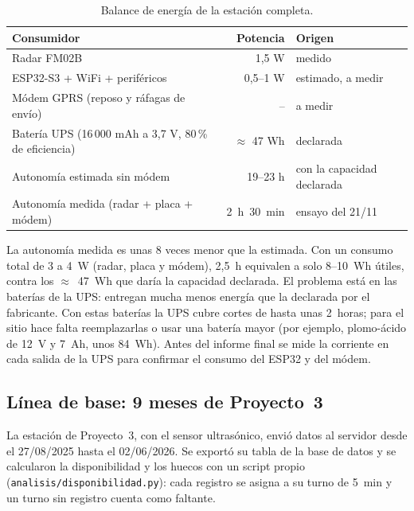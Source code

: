 \documentclass[11pt,a4paper]{article}
\begin{document}
\begin{table}[H]
    \centering
    \small
    \caption{Balance de energía de la estación completa.}
    \begin{tabular}{lrl}
        \toprule
        \textbf{Consumidor} & \textbf{Potencia} & \textbf{Origen} \\
        \midrule
        Radar FM02B & 1,5 W & medido \\
        ESP32-S3 + WiFi + periféricos & 0,5--1 W & estimado, a medir \\
        Módem GPRS (reposo y ráfagas de envío) & -- & a medir \\
        \midrule
        Batería UPS (16\,000 mAh a 3,7 V, 80\,\% de eficiencia) & $\approx$ 47 Wh & declarada \\
        Autonomía estimada sin módem & 19--23 h & con la capacidad declarada \\
        Autonomía medida (radar + placa + módem) & 2~h~30~min & ensayo del 21/11 \\
        \bottomrule
    \end{tabular}
\end{table}

La autonomía medida es unas 8 veces menor que la estimada. Con un consumo total
de 3 a 4~W (radar, placa y módem), 2,5~h equivalen a solo 8--10~Wh útiles,
contra los $\approx$~47~Wh que daría la capacidad declarada. El problema
está en las baterías de la UPS: entregan mucha menos energía que la declarada
por el fabricante. Con estas baterías la UPS cubre cortes de hasta unas
2~horas; para el sitio hace falta reemplazarlas o usar una batería mayor (por
ejemplo, plomo-ácido de 12~V y 7~Ah, unos 84~Wh). Antes del informe final se
mide la corriente en cada salida de la UPS para confirmar el consumo del
ESP32 y del módem.

\subsection{Línea de base: 9 meses de Proyecto~3}
\label{sec:linea_base}

La estación de Proyecto~3, con el sensor ultrasónico, envió datos al servidor
desde el 27/08/2025 hasta el 02/06/2026. Se exportó su tabla de la base de
datos y se calcularon la disponibilidad y los huecos con un script propio
(\texttt{analisis/disponibilidad.py}): cada registro se asigna a su turno de
5~min y un turno sin registro cuenta como faltante.
\end{document}

